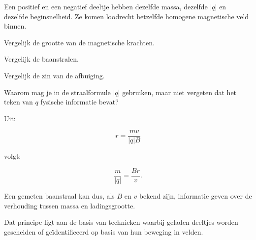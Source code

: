 \documentclass{ximera}
\begin{document}
\begin{oefening}{\oefU}

Een positief en een negatief deeltje hebben dezelfde massa, dezelfde
$|q|$ en dezelfde beginsnelheid. Ze komen loodrecht hetzelfde homogene
magnetische veld binnen.

\begin{question}
Vergelijk de grootte van de magnetische krachten.
\end{question}

\begin{question}
Vergelijk de baanstralen.
\end{question}

\begin{question}
Vergelijk de zin van de afbuiging.
\end{question}

\begin{question}
Waarom mag je in de straalformule $|q|$ gebruiken, maar niet vergeten
dat het teken van $q$ fysische informatie bevat?
\end{question}

\end{oefening}




Uit:

\[
r=\frac{mv}{|q|B}
\]

volgt:

\[
\boxed{
\frac{m}{|q|}
=
\frac{Br}{v}.
}
\]

Een gemeten baanstraal kan dus, als $B$ en $v$ bekend zijn, informatie
geven over de verhouding tussen massa en ladingsgrootte.

Dat principe ligt aan de basis van technieken waarbij geladen deeltjes
worden gescheiden of geïdentificeerd op basis van hun beweging in
velden.
\end{document}
